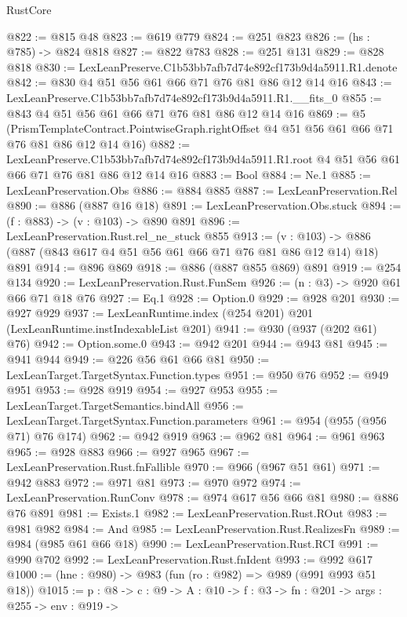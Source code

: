 \begin{lexlean}{RustCore}
\begin{coremodule}
@822 := @815 @48
@823 := @619 @779
@824 := @251 @823
@826 := (hs : @785) -> @824 @818
@827 := @822 @783
@828 := @251 @131
@829 := @828 @818
@830 := LexLeanPreserve.C1b53bb7afb7d74e892cf173b9d4a5911.R1.denote
@842 := @830 @4 @51 @56 @61 @66 @71 @76 @81 @86 @12 @14 @16
@843 := LexLeanPreserve.C1b53bb7afb7d74e892cf173b9d4a5911.R1.__fits_0
@855 := @843 @4 @51 @56 @61 @66 @71 @76 @81 @86 @12 @14 @16
@869 := @5
    (PrismTemplateContract.PointwiseGraph.rightOffset
      @4
      @51
      @56
      @61
      @66
      @71
      @76
      @81
      @86
      @12
      @14
      @16)
@882 := LexLeanPreserve.C1b53bb7afb7d74e892cf173b9d4a5911.R1.root
    @4
    @51
    @56
    @61
    @66
    @71
    @76
    @81
    @86
    @12
    @14
    @16
@883 := Bool
@884 := Ne.{1}
@885 := LexLeanPreservation.Obs
@886 := @884 @885
@887 := LexLeanPreservation.Rel
@890 := @886 (@887 @16 @18)
@891 := LexLeanPreservation.Obs.stuck
@894 := (f : @883) -> (v : @103) -> @890 @891
@896 := LexLeanPreservation.Rust.rel_ne_stuck @855
@913 := (v : @103) -> @886 (@887 (@843 @617 @4 @51 @56 @61 @66 @71 @76 @81 @86 @12 @14) @18) @891
@914 := @896 @869
@918 := @886 (@887 @855 @869) @891
@919 := @254 @134
@920 := LexLeanPreservation.Rust.FunSem
@926 := (n : @3) -> @920 @61 @66 @71 @18 @76
@927 := Eq.{1}
@928 := Option.{0}
@929 := @928 @201
@930 := @927 @929
@937 := LexLeanRuntime.index (@254 @201) @201 (LexLeanRuntime.instIndexableList @201)
@941 := @930 (@937 (@202 @61) @76)
@942 := Option.some.{0}
@943 := @942 @201
@944 := @943 @81
@945 := @941 @944
@949 := @226 @56 @61 @66 @81
@950 := LexLeanTarget.TargetSyntax.Function.types
@951 := @950 @76
@952 := @949 @951
@953 := @928 @919
@954 := @927 @953
@955 := LexLeanTarget.TargetSemantics.bindAll
@956 := LexLeanTarget.TargetSyntax.Function.parameters
@961 := @954 (@955 (@956 @71) @76 @174)
@962 := @942 @919
@963 := @962 @81
@964 := @961 @963
@965 := @928 @883
@966 := @927 @965
@967 := LexLeanPreservation.Rust.fnFallible
@970 := @966 (@967 @51 @61)
@971 := @942 @883
@972 := @971 @81
@973 := @970 @972
@974 := LexLeanPreservation.RunConv
@978 := @974 @617 @56 @66 @81
@980 := @886 @76 @891
@981 := Exists.{1}
@982 := LexLeanPreservation.Rust.ROut
@983 := @981 @982
@984 := And
@985 := LexLeanPreservation.Rust.RealizesFn
@989 := @984 (@985 @61 @66 @18)
@990 := LexLeanPreservation.Rust.RCI
@991 := @990 @702
@992 := LexLeanPreservation.Rust.fnIdent
@993 := @992 @617
@1000 := (hne : @980) -> @983 (fun (ro : @982) => @989 (@991 @993 @51 @18))
@1015 := {p : @8} ->
  {c : @9} ->
  {A : @10} ->
  {f : @3} ->
  {fn : @201} ->
  {args : @255} ->
  {env : @919} ->

\end{coremodule}
\end{lexlean}
